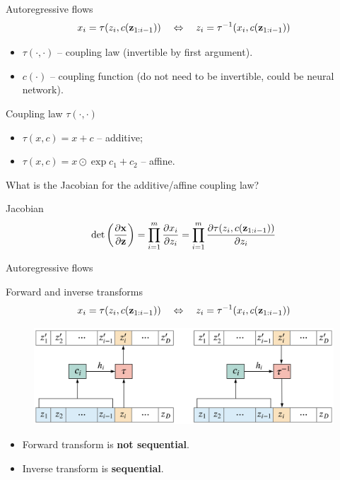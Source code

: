 \begin{frame}{Autoregressive flows}
	\vspace{-0.3cm}
	\[
		x_i = \tau (z_i, c(\mathbf{z}_{1:i-1})) \quad \Leftrightarrow \quad z_i = \tau^{-1} (x_i, c(\mathbf{z}_{1:i-1}))
	\]
	\vspace{-0.3cm}
	\begin{itemize}
		\item $\tau (\cdot, \cdot)$ -- coupling law (invertible by first argument).
		\item $c(\cdot)$ -- coupling function (do not need to be invertible, could be neural network).
	\end{itemize}
	\begin{block}{Coupling law $\tau(\cdot, \cdot)$}
		\begin{itemize}
			\item $\tau(x, c) = x + c$ -- additive;
			\item $\tau(x, c) = x \odot \exp{c_1} + c_2$ -- affine.
		\end{itemize}
	\end{block}
	What is the Jacobian for the additive/affine coupling law? 
	\begin{block}{Jacobian}
		\vspace{-0.3cm}
		\[
			\det \left( \frac{\partial \mathbf{x}}{\partial \mathbf{z}} \right) = \prod_{i=1}^m \frac{\partial x_i}{\partial z_i} = \prod_{i=1}^m \frac{\partial \tau (z_i, c(\mathbf{z}_{1:i-1})) }{\partial z_i}
		\]
		\vspace{-0.3cm}
	\end{block}
	
\end{frame}
\begin{frame}{Autoregressive flows}
	\begin{block}{Forward and inverse transforms}
		\[
			x_i = \tau (z_i, c(\mathbf{z}_{1:i-1})) \quad \Leftrightarrow \quad z_i = \tau^{-1} (x_i, c(\mathbf{z}_{1:i-1}))
		\]
		\begin{figure}
			\includegraphics[width=\linewidth]{figs/autoregressive_flow}
		\end{figure}
	\end{block}
	\begin{itemize}
		\item Forward transform is \textbf{not sequential}.
		\item Inverse transform is \textbf{sequential}.
	\end{itemize}
		
\end{frame}
